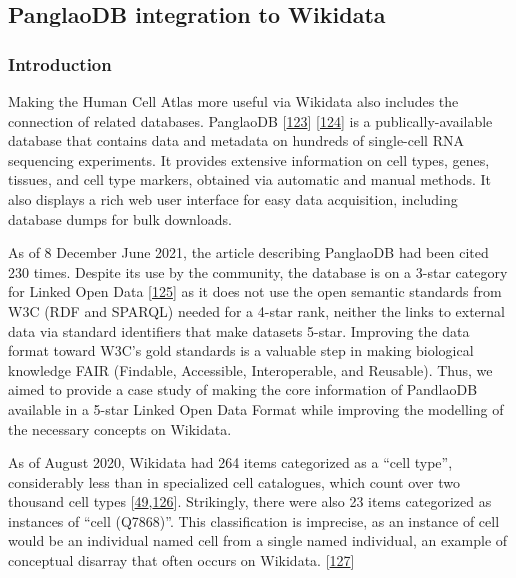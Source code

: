 \hypertarget{panglaodb-integration-to-wikidata}{%
\subsection{PanglaoDB integration to Wikidata}\label{panglaodb-integration-to-wikidata}}

\hypertarget{introduction}{%
\subsubsection{Introduction}\label{introduction}}

Making the Human Cell Atlas more useful via Wikidata also includes the connection of related databases.
PanglaoDB {[}\protect\hyperlink{ref-M0lqRYJb}{123}{]} {[}\protect\hyperlink{ref-T3PlZ3Vh}{124}{]} is a publically-available database that contains data and metadata on hundreds of single-cell RNA sequencing experiments.
It provides extensive information on cell types, genes, tissues, and cell type markers, obtained via automatic and manual methods.
It also displays a rich web user interface for easy data acquisition, including database dumps for bulk downloads.

As of 8 December June 2021, the article describing PanglaoDB had been cited 230 times.
Despite its use by the community, the database is on a 3-star category for Linked Open Data {[}\protect\hyperlink{ref-OGXYtGZ8}{125}{]} as it does not use the open semantic standards from W3C (RDF and SPARQL) needed for a 4-star rank, neither the links to external data via standard identifiers that make datasets 5-star.
Improving the data format toward W3C's gold standards is a valuable step in making biological knowledge FAIR (Findable, Accessible, Interoperable, and Reusable).
Thus, we aimed to provide a case study of making the core information of PandlaoDB available in a 5-star Linked Open Data Format while improving the modelling of the necessary concepts on Wikidata.

As of August 2020, Wikidata had 264 items categorized as a ``cell type'', considerably less than in specialized cell catalogues, which count over two thousand cell types {[}\protect\hyperlink{ref-agnqfdk6}{49},\protect\hyperlink{ref-4AEy2xhQ}{126}{]}.
Strikingly, there were also 23 items categorized as instances of ``cell (Q7868)''.
This classification is imprecise, as an instance of cell would be an individual named cell from a single named individual, an example of conceptual disarray that often occurs on Wikidata. {[}\protect\hyperlink{ref-imSZTi52}{127}{]}

